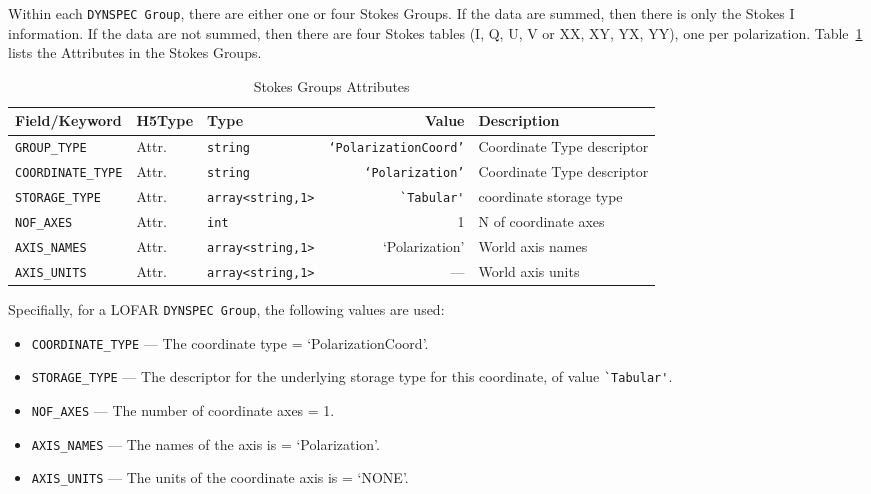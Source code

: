 \documentclass[a4paper,10pt,bibtotoc]{scrartcl}
\begin{document}
Within each \texttt{DYNSPEC Group}, there are either one or four Stokes Groups.
If the data are summed, then there is only the Stokes I information. If the data
are not
summed, then there are four Stokes tables (I, Q, U, V or XX, XY, YX, YY), one 
per polarization.
Table~\ref{tab:stokes attributes} lists the Attributes in the Stokes Groups. 

\begin{center}
\begin{table}
  \begin{tabular}{|lllrp{5.5cm}|}
    \hline
    \sc Field/Keyword & \sc H5Type & \sc Type & \sc Value & \sc Description \\
    \hline \hline
   \small{\verb|GROUP_TYPE|} & Attr. & \verb|string| &
   {\texttt{`PolarizationCoord'}} & Coordinate Type descriptor \\
   \small{\verb|COORDINATE_TYPE|} & Attr. & \verb|string| & {\texttt{`Polarization'}} & Coordinate Type descriptor \\
     \small{\verb|STORAGE_TYPE|} & Attr. & \small\verb|array<string,1>| & \small
    	\verb|`Tabular'| & coordinate storage type \\    
    \small{\verb|NOF_AXES|}              & Attr. & \verb|int| & 1 & N of coordinate axes \\
    \small{\verb|AXIS_NAMES|}          & Attr. & \verb|array<string,1>| & `Polarization' & World axis names \\
    \small{\verb|AXIS_UNITS|}          & Attr. & \verb|array<string,1>| & --- & World axis units \\
    \hline
  \end{tabular}
  \caption{Stokes Groups Attributes}
  \label{tab:stokes attributes}
  \end{table}
\end{center}

Specifially, for a LOFAR \texttt{DYNSPEC Group}, the following values are used:

\begin{itemize}
  \item \verb|COORDINATE_TYPE| --- 
  The coordinate type = `PolarizationCoord'.
  \item \verb|STORAGE_TYPE| --- The descriptor for the underlying storage
  type for this coordinate, of value \verb|`Tabular'|.
  \item \verb|NOF_AXES| --- 
  The number of coordinate axes = 1.
  \item \verb|AXIS_NAMES| --- 
  The names of the axis is = `Polarization'.
  \item \verb|AXIS_UNITS| --- 
  The units of the coordinate axis is = `NONE'.
\end{itemize}
\end{document}
